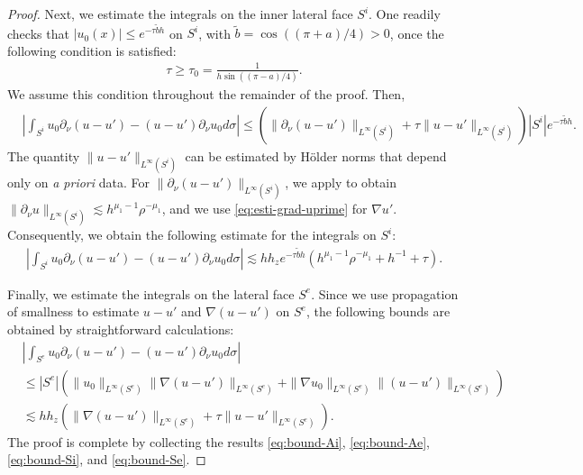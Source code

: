 ﻿\documentclass[11pt,reqno,oneside]{amsart}
\theoremstyle{definition}
\theoremstyle{remark}
\newcommand{\n}{\nabla}
\renewcommand{\t}{\theta}
\newcommand{\p}{\partial}
\begin{document}
\begin{proof}
            

            Next, we estimate the integrals on the inner lateral face $S^i$. One readily checks that $|u_0(x)|\leq e^{-\tau\widetilde{b}h}$ on $S^i$, with $\widetilde{b}=\cos((\pi+a)/4)>0$, once the following condition is satisfied:
            \begin{align}\label{eq:tau0}
                \tau\geq \tau_0=\frac{1}{h\sin((\pi-a)/4)}.
            \end{align}
            We assume this condition throughout the remainder of the proof. Then,
            \begin{align*}
                &\left|\int_{S^i} u_0 \p_\nu (u-u')-(u-u')\p_\nu u_0 d\sigma\right| \leq \left(\|\p_\nu(u-u')\|_{L^\infty(S^i)} + \tau\|u-u'\|_{L^\infty(S^i)}\right)|S^i| e^{-\tau \widetilde{b} h}.
            \end{align*}
            The quantity $\|u-u'\|_{L^\infty(S^i)}$ can be estimated by H\"older norms that depend only on {\it a priori} data. For $\|\p_\nu(u-u')\|_{L^\infty(S^i)}$, we apply  to obtain $\|\p_\nu u\|_{L^\infty(S^i)}\lesssim h^{\mu_1-1}\rho^{-\mu_1}$, and we use \eqref{eq:esti-grad-uprime} for $\n u'$. Consequently, we obtain the following estimate for the integrals on $S^i$:
            \begin{align}\label{eq:bound-Si}
                \left|\int_{S^i} u_0 \p_\nu (u-u')-(u-u')\p_\nu u_0 d\sigma\right|\lesssim hh_z e^{-\tau \widetilde{b} h} (h^{\mu_1-1}\rho^{-\mu_1}+h^{-1}+\tau).
            \end{align}

            Finally, we estimate the integrals on the lateral face $S^e$. Since we use propagation of smallness to estimate $u-u'$ and $\n(u-u')$ on $S^e$, the following bounds are obtained by straightforward calculations:
            \begin{align}\label{eq:bound-Se}
                &\left|\int_{S^e} u_0 \p_\nu (u-u')- (u-u')\p_\nu u_0 d\sigma\right| \nonumber \\
                 &\leq |S^e|\left(\|u_0\|_{L^\infty(S^e)}\|\n (u-u')\|_{L^\infty(S^e)} +\|\n u_0\|_{L^\infty(S^e)}\|(u-u')\|_{L^\infty(S^e)}\right)  \nonumber \\
                &\lesssim h h_z \left(\|\n(u-u')\|_{L^\infty(S^e)}+\tau\|u-u'\|_{L^\infty(S^e)}\right).
            \end{align}
            The proof is complete by collecting the results \eqref{eq:bound-Ai}, \eqref{eq:bound-Ae}, \eqref{eq:bound-Si}, and \eqref{eq:bound-Se}.
        \end{proof}
\end{document}
